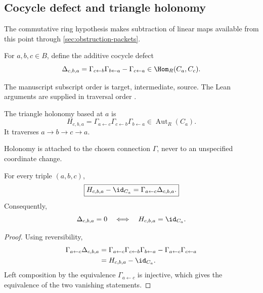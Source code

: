 \subsection{Cocycle defect and triangle holonomy}

The commutative ring hypothesis makes subtraction of linear maps available
from this point through \cref{sec:obstruction-packets}.

\begin{definition}
\label{def:cocycle-defect}
For $a,b,c\in B$, define the additive cocycle defect
\[
\Delta_{c,b,a}
=
\Gamma_{c\leftarrow b}\Gamma_{b\leftarrow a}
-\Gamma_{c\leftarrow a}
\in\Hom_R(C_a,C_c).
\]
\end{definition}

The manuscript subscript order is target, intermediate, source.  The Lean
arguments are supplied in traversal order .

\begin{definition}
\label{def:triangle-holonomy}
The triangle holonomy based at $a$ is
\[
H_{c,b,a}
=
\Gamma_{a\leftarrow c}
\Gamma_{c\leftarrow b}
\Gamma_{b\leftarrow a}
\in\operatorname{Aut}_R(C_a).
\]
It traverses $a\to b\to c\to a$.
\end{definition}

Holonomy is attached to the chosen connection $\Gamma$, never to an
unspecified coordinate change.

\begin{theorem}
\label{thm:defect-holonomy}
For every triple $(a,b,c)$,
\[
\boxed{
H_{c,b,a}-\id_{C_a}
=
\Gamma_{a\leftarrow c}\Delta_{c,b,a}.
}
\]
Consequently,
\[
\Delta_{c,b,a}=0
\quad\Longleftrightarrow\quad
H_{c,b,a}=\id_{C_a}.
\]
\end{theorem}

\begin{proof}
Using reversibility,
\[
\begin{aligned}
\Gamma_{a\leftarrow c}\Delta_{c,b,a}
&=
\Gamma_{a\leftarrow c}
\Gamma_{c\leftarrow b}
\Gamma_{b\leftarrow a}
-
\Gamma_{a\leftarrow c}\Gamma_{c\leftarrow a}\\
&=H_{c,b,a}-\id_{C_a}.
\end{aligned}
\]
Left composition by the equivalence $\Gamma_{a\leftarrow c}$ is injective,
which gives the equivalence of the two vanishing statements.
\end{proof}

